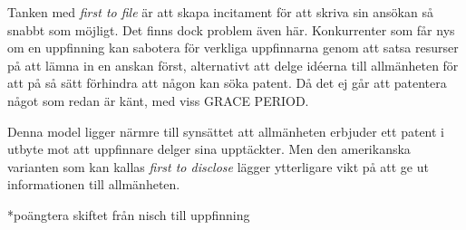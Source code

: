 Tanken med \emph{first to file} är att skapa incitament för att skriva sin ansökan så snabbt som möjligt. Det finns dock problem även här. Konkurrenter som får nys om en uppfinning kan sabotera för verkliga uppfinnarna genom att satsa resurser på att lämna in en anskan först, alternativt att delge idéerna till allmänheten för att på så sätt förhindra att någon kan söka patent. Då det ej går att patentera något som redan är känt, med viss GRACE PERIOD.

Denna model ligger närmre till synsättet att allmänheten erbjuder ett patent i utbyte mot att uppfinnare delger sina upptäckter. Men den amerikanska varianten som kan kallas \emph{first to disclose} lägger ytterligare vikt på att ge ut informationen till allmänheten. 


*poängtera skiftet från nisch till uppfinning